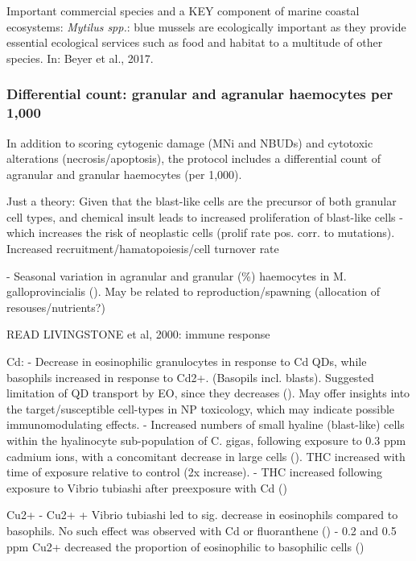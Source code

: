 Important commercial species and a KEY component of marine coastal ecosystems: \emph{Mytilus spp.}: blue mussels are ecologically important as they provide essential ecological services such as food and habitat to a multitude of other species. In: Beyer et al., 2017.


\subsubsection{Differential count: granular and agranular haemocytes per 1,000} %
In addition to scoring cytogenic damage (MNi and NBUDs) and cytotoxic alterations (necrosis/apoptosis), the protocol includes a differential count of agranular and granular haemocytes (per 1,000).

Just a theory: Given that the blast-like cells are the precursor of both granular cell types, and chemical insult leads to increased proliferation of blast-like cells - which increases the risk of neoplastic cells (prolif rate pos. corr. to mutations). Increased recruitment/hamatopoiesis/cell turnover rate

- Seasonal variation in agranular and granular (\%) haemocytes in M. galloprovincialis (\cite{Santarem1994}). May be related to reproduction/spawning (allocation of resouses/nutrients?)

READ LIVINGSTONE et al, 2000: immune response


Cd:
- Decrease in eosinophilic granulocytes in response to Cd QDs, while basophils increased in response to Cd2+. (Basopils incl. blasts). Suggested limitation of QD transport by EO, since they decreases (\cite{Rocha2014}). May offer insights into the target/susceptible cell-types in NP toxicology, which may indicate possible immunomodulating effects. %
- Increased numbers of small hyaline (blast-like) cells within the hyalinocyte sub-population of C. gigas, following exposure to 0.3 ppm cadmium ions, with a concomitant decrease in large cells (\cite{Auffret1994}). THC increased with time of exposure relative to control (2x increase). %
- THC increased following exposure to Vibrio tubiashi after preexposure with Cd (\cite{Pipe1995}) %



Cu2+  
- Cu2+ + Vibrio tubiashi led to sig. decrease in eosinophils compared to basophils. No such effect was observed with Cd or fluoranthene (\cite{Pipe1995}) %
- 0.2 and 0.5 ppm Cu2+ decreased the proportion of eosinophilic to basophilic cells (\cite{Pipe1999})

